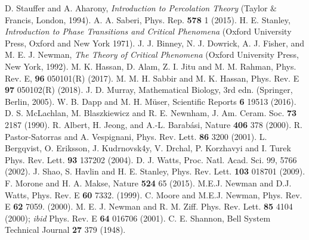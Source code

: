 \documentclass[twocolumn,showpacs,preprintnumbers,amsmath,amssymb]{article}
\begin{document}
\begin{thebibliography}{99}
 
 
 D. Stauffer and A. Aharony, {\it Introduction to Percolation Theory} (Taylor 
$\&$ Francis, London, 1994).
  A. A. Saberi, Phys. Rep. {\bf 578} 1 (2015).
 H. E. Stanley, {\it Introduction to Phase Transitions and 
Critical Phenomena} (Oxford University Press, Oxford and New York 1971).
 J.  J.  Binney,  N.  J.  Dowrick,  A.  J.  Fisher,  and  M.  E.  J.  Newman,  {\it The  Theory  of Critical  Phenomena}  (Oxford University Press, New York, 1992).
 M. K. Hassan, D. Alam, Z. I. Jitu and M. M. Rahman, Phys. Rev. E, {\bf 96} 050101(R) (2017).
 M. M. H. Sabbir and M. K. Hassan, Phys. Rev. E {\bf 97} 050102(R) (2018).
 J. D. Murray, Mathematical Biology, 3rd edn. (Springer,
Berlin, 2005).
 W. B. Dapp and M. H. M\"{u}ser, Scientific Reports {\bf 6} 19513 (2016).
 D. S. McLachlan, M. Blaszkiewicz and R. E. Newnham,
J. Am. Ceram. Soc. {\bf 73} 2187 (1990).
  R. Albert, H. Jeong, and A.-L. Barab\'{a}si, Nature {\bf 406} 378 (2000).
 R. Pastor-Satorras and A. Vespignani, Phys. Rev. Lett. {\bf 86}
3200 (2001).
  L. Bergqvist, O. Eriksson, J. Kudrnovsk4y, V. Drchal,
P. Korzhavyi and I. Turek Phys. Rev. Lett. {\bf 93} 137202 (2004).
 D. J. Watts, Proc. Natl. Acad. Sci. 99, 5766 (2002).
 J. Shao, S. Havlin and H. E. Stanley, Phys. Rev. Lett.
{\bf 103} 018701 (2009).
 F. Morone  and H. A. Makse,  Nature {\bf 524} 65 (2015).
 M.E.J. Newman and D.J. Watts, Phys. Rev. E {\bf 60} 7332. (1999).
  C. Moore and M.E.J. Newman, Phys. Rev. E {\bf 62} 7059. (2000).
 M. E. J. Newman  and R. M. Ziff. Phys. Rev. Lett. {\bf 85} 4104 (2000); {\it ibid} Phys. Rev. E {\bf 64} 016706 (2001).
 C. E. Shannon, Bell System Technical Journal {\bf 27} 379 (1948).

\end{thebibliography}
\end{document}
